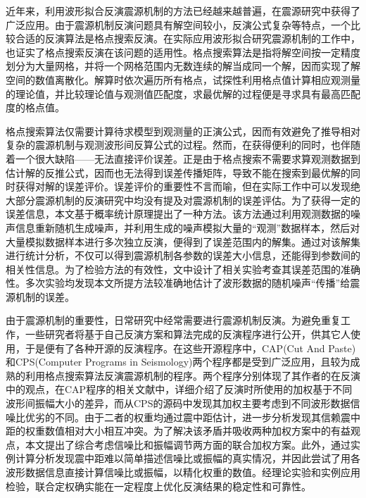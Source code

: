 

\begin{cnabstract}
近年来，利用波形拟合反演震源机制的方法已经越来越普遍，在震源研究中获得了广泛应用。由于震源机制反演问题具有解空间较小，反演公式复杂等特点，一个比较合适的反演算法是格点搜索反演。在实际应用波形拟合研究震源机制的工作中，也证实了格点搜索反演在该问题的适用性。格点搜索算法是指将解空间按一定精度划分为大量网格，并将一个网格范围内无数连续的解当成同一个解，因而实现了解空间的数值离散化。解算时依次遍历所有格点，试探性利用格点值计算相应观测量的理论值，并比较理论值与观测值匹配度，求最优解的过程便是寻求具有最高匹配度的格点值。

格点搜索算法仅需要计算待求模型到观测量的正演公式，因而有效避免了推导相对复杂的震源机制与观测波形间反算公式的过程。然而，在获得便利的同时，也伴随着一个很大缺陷——无法直接评价误差。正是由于格点搜索不需要求算观测数据到估计解的反推公式，因而也无法得到误差传播矩阵，导致不能在搜索到最优解的同时获得对解的误差评价。误差评价的重要性不言而喻，但在实际工作中可以发现绝大部分震源机制的反演研究中均没有提及对震源机制的误差评估。为了获得一定的误差信息，本文基于概率统计原理提出了一种方法。该方法通过利用观测数据的噪声信息重新随机生成噪声，并利用生成的噪声模拟大量的“观测”数据样本，然后对大量模拟数据样本进行多次独立反演，便得到了误差范围内的解集。通过对该解集进行统计分析，不仅可以得到震源机制各参数的误差大小信息，还能得到参数间的相关性信息。为了检验方法的有效性，文中设计了相关实验考查其误差范围的准确性。多次实验均发现本文所提方法较准确地估计了波形数据的随机噪声“传播”给震源机制的误差。

由于震源机制的重要性，日常研究中经常需要进行震源机制反演。为避免重复工作，一些研究者将基于自己反演方案和算法完成的反演程序进行公开，供其它人使用，于是便有了各种开源的反演程序。在这些开源程序中，CAP(Cut And Paste)和CPS(Computer Programs in Seismology)两个程序都是受到广泛应用，且较为成熟的利用格点搜索算法反演震源机制的程序。两个程序分别体现了其作者的在反演中的观点，在CAP程序的相关文献中，详细介绍了反演时所使用的加权基于不同波形间振幅大小的差异，而从CPS的源码中发现其加权主要考虑到不同波形数据信噪比优劣的不同。由于二者的权重均通过震中距估计，进一步分析发现其信赖震中距的权重数值相对大小相互冲突。为了解决该矛盾并吸收两种加权方案中的有益观点，本文提出了综合考虑信噪比和振幅调节两方面的联合加权方案。此外，通过实例计算分析发现震中距难以简单描述信噪比或振幅的真实情况，并因此尝试了用各波形数据信息直接计算信噪比或振幅，以精化权重的数值。经理论实验和实例应用检验，联合定权确实能在一定程度上优化反演结果的稳定性和可靠性。


\end{cnabstract}
